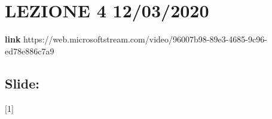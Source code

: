 \section{LEZIONE 4 12/03/2020}
\textbf{link} https://web.microsoftstream.com/video/96007b98-89e3-4685-9c96-ed78e886c7a9
\subsection{Slide: }
[1]
\newline[2]
\newline[3]
\newline[4]
\newline[5]
\newline[6]
\newline[7]
\newline[8]
\newline[9]
\newline[10]
\newline[11]
\newline[12]
\newline[13]
\newline[14]
\newline[15]
\newline[16]
\newline[17]
\newline[18]
\newline[19]
\newline[20]
\newline[21]
\newline[22]
\newline[23]
\newline[24]
\newline[25]
\newline[26]
\newline[27]
\newline[28]
\newline[29]
\newline[30]
\newline[31]
\newline[32]
\newline[33]